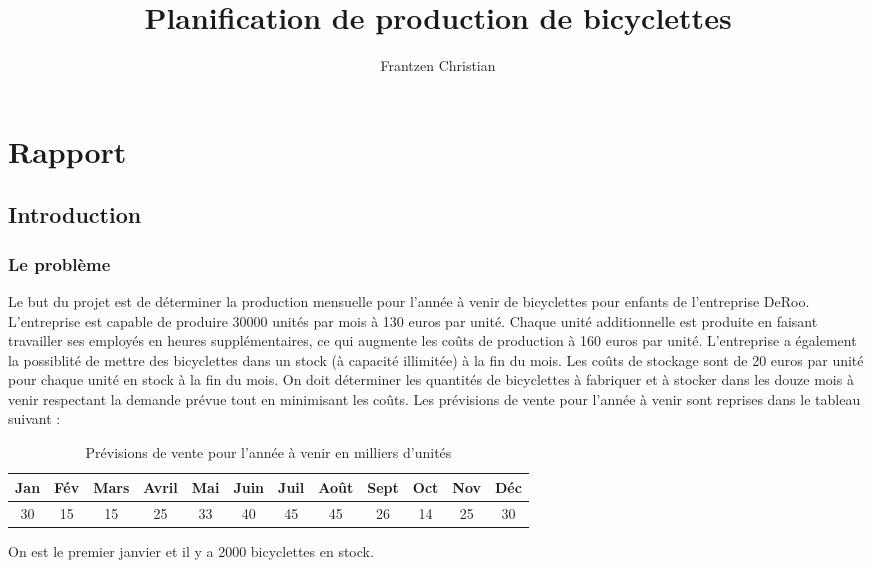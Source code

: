 \documentclass[11pt,a4paper]{report}
\author{Frantzen Christian}
\title{Planification de production de bicyclettes}
\begin{document}
\maketitle
\chapter*{Rapport}
\section*{Introduction}
\subsection*{Le problème}
Le but du projet est de déterminer la production mensuelle pour l'année à venir de bicyclettes pour enfants de l'entreprise DeRoo. L'entreprise est capable de produire 30000 unités par mois à 130 euros par unité. Chaque unité additionnelle est produite en faisant travailler ses employés en heures supplémentaires, ce qui augmente les coûts de production à 160 euros par unité.\newline
L'entreprise a également la possiblité de mettre des bicyclettes dans un stock (à capacité illimitée) à la fin du mois. Les coûts de stockage sont de 20 euros par unité pour chaque unité en stock à la fin du mois. \newline
On doit déterminer les quantités de bicyclettes à fabriquer et à stocker dans les douze mois à venir respectant la demande prévue tout en minimisant les coûts. Les prévisions de vente pour l'année à venir sont reprises dans le tableau suivant :
\begin{table}[h]
\centering
\caption{Prévisions de vente pour l'année à venir en milliers d'unités}
\begin{tabular}{ |c |c| c| c| c| c| c| c| c| c| c| c|}
\hline
 Jan & Fév & Mars & Avril & Mai & Juin & Juil & Août & Sept & Oct & Nov & Déc\\  
 \hline
 30 & 15 & 15 & 25 & 33 & 40 & 45 & 45 & 26 & 14 & 25 & 30 \\
 \hline
\end{tabular}
\end{table}
\newline
On est le premier janvier et il y a 2000 bicyclettes en stock.
\end{document}
